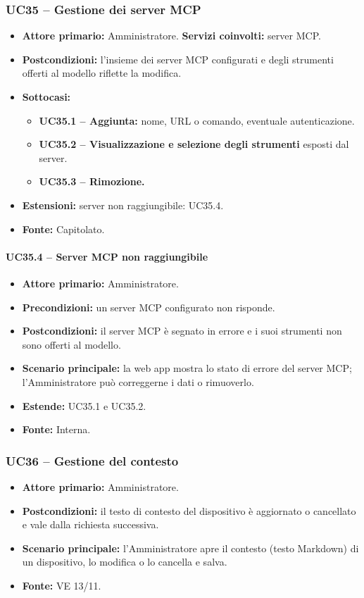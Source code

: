 \documentclass[12pt,a4paper]{article}
\newcommand{\tightlist}{\setlength{\itemsep}{1pt}\setlength{\parskip}{0pt}}
\begin{document}
\subsubsection{UC35 -- Gestione dei server MCP}
\begin{itemize}
\tightlist
\item \textbf{Attore primario:} Amministratore. \textbf{Servizi coinvolti:} server MCP.
\item \textbf{Postcondizioni:} l'insieme dei server MCP configurati e degli strumenti offerti al modello riflette la modifica.
\item \textbf{Sottocasi:}
\begin{itemize}
\tightlist
\item \textbf{UC35.1 -- Aggiunta:} nome, URL o comando, eventuale autenticazione.
\item \textbf{UC35.2 -- Visualizzazione e selezione degli strumenti} esposti dal server.
\item \textbf{UC35.3 -- Rimozione.}
\end{itemize}
\item \textbf{Estensioni:} server non raggiungibile: UC35.4.
\item \textbf{Fonte:} Capitolato.
\end{itemize}

\paragraph{UC35.4 -- Server MCP non raggiungibile}
\begin{itemize}
\tightlist
\item \textbf{Attore primario:} Amministratore.
\item \textbf{Precondizioni:} un server MCP configurato non risponde.
\item \textbf{Postcondizioni:} il server MCP è segnato in errore e i suoi strumenti non sono offerti al modello.
\item \textbf{Scenario principale:} la web app mostra lo stato di errore del server MCP; l'Amministratore può correggerne i dati o rimuoverlo.
\item \textbf{Estende:} UC35.1 e UC35.2.
\item \textbf{Fonte:} Interna.
\end{itemize}

\subsubsection{UC36 -- Gestione del contesto}
\begin{itemize}
\tightlist
\item \textbf{Attore primario:} Amministratore.
\item \textbf{Postcondizioni:} il testo di contesto del dispositivo è aggiornato o cancellato e vale dalla richiesta successiva.
\item \textbf{Scenario principale:} l'Amministratore apre il contesto (testo Markdown) di un dispositivo, lo modifica o lo cancella e salva.
\item \textbf{Fonte:} VE 13/11.
\end{itemize}
\end{document}
